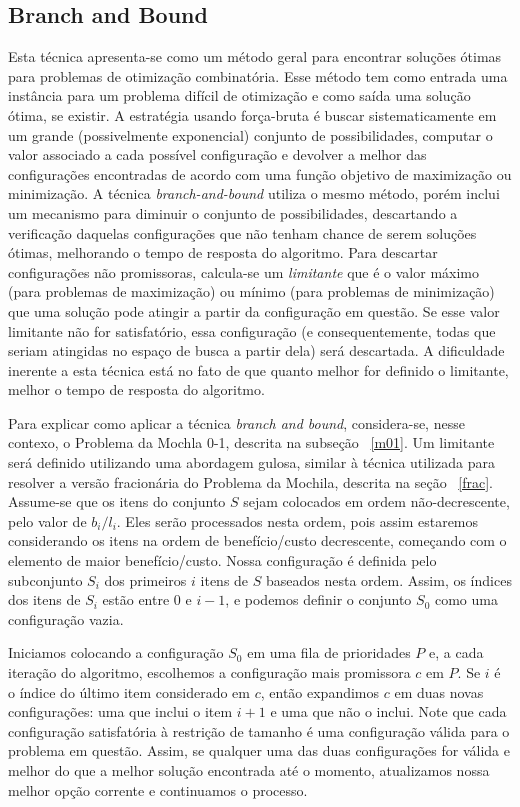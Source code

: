 \subsection{Branch and Bound} \label{bb}

Esta técnica apresenta-se como um método geral para encontrar soluções ótimas para problemas de otimização combinatória. Esse método tem como entrada uma instância para um problema difícil de otimização e como saída uma solução ótima, se existir. A estratégia usando força-bruta é buscar sistematicamente em um grande (possivelmente exponencial) conjunto de possibilidades, computar o valor associado a cada possível configuração e devolver a melhor das configurações encontradas de acordo com uma função objetivo de maximização ou minimização. A técnica {\it branch-and-bound} utiliza o mesmo método, porém inclui um mecanismo para diminuir o conjunto de possibilidades, descartando a verificação daquelas configurações que não tenham chance de serem soluções ótimas, melhorando o tempo de resposta do algoritmo. Para descartar configurações não promissoras, calcula-se um {\it limitante} que é o valor máximo (para problemas de maximização) ou mínimo (para problemas de minimização) que uma solução pode atingir a partir da configuração em questão. Se esse valor limitante não for satisfatório, essa configuração  (e consequentemente, todas que seriam atingidas no espaço de busca a partir dela) será descartada. A dificuldade inerente a esta técnica está no fato de que quanto melhor for definido o limitante, melhor o tempo de resposta do algoritmo.

Para explicar como aplicar a técnica {\it branch and bound},  considera-se, nesse contexo, o Problema da Mochla 0-1, descrita na subseção ~\ref{m01}. Um limitante será definido utilizando uma abordagem gulosa, similar à técnica utilizada para resolver a versão fracionária do Problema da Mochila, descrita na seção ~\ref{frac}. Assume-se que os itens do conjunto $S$ sejam colocados em ordem não-decrescente, pelo valor de $b_i/l_i$. Eles serão processados nesta ordem, pois assim estaremos considerando os itens na ordem de benefício/custo decrescente, começando com o elemento de maior benefício/custo. Nossa configuração é definida pelo subconjunto $S_i$ dos primeiros $i$ itens de $S$ baseados nesta ordem. Assim, os índices dos itens de $S_i$ estão entre 0 e $i-1$, e podemos definir o conjunto $S_0$ como uma configuração vazia. 

Iniciamos colocando a configuração $S_0$ em uma fila de prioridades $P$ e, a cada iteração do algoritmo, escolhemos a configuração mais promissora $c$ em $P$. Se $i$ é o índice do último item considerado em $c$, então expandimos $c$ em duas novas configurações: uma que inclui o item $i+1$ e uma que não o inclui. Note que cada configuração satisfatória à restrição de tamanho é uma configuração válida para o problema em questão. Assim, se qualquer uma das duas configurações for válida e melhor do que a melhor solução encontrada até o momento, atualizamos nossa melhor opção corrente e continuamos o processo. 

